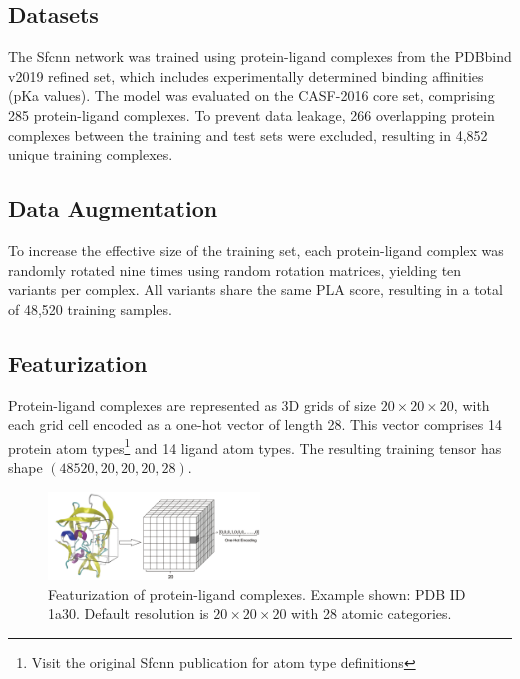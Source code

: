 \documentclass[unnumsec,webpdf,contemporary,large]{oup-authoring-template}
\theoremstyle{thmstyleone}%
\theoremstyle{thmstyletwo}%
\theoremstyle{thmstylethree}%
\begin{document}
\subsection{Datasets}
\vspace{0.5em}
The Sfcnn network was trained using protein-ligand complexes from the PDBbind v2019 refined set, which includes experimentally determined binding affinities (pKa values). The model was evaluated on the CASF-2016 core set, comprising 285 protein-ligand complexes. To prevent data leakage, 266 overlapping protein complexes between the training and test sets were excluded, resulting in 4,852 unique training complexes.

\subsection{Data Augmentation}
\vspace{0.5em}
To increase the effective size of the training set, each protein-ligand complex was randomly rotated nine times using random rotation matrices, yielding ten variants per complex. All variants share the same PLA score, resulting in a total of 48,520 training samples.

\subsection{Featurization}
\vspace{0.5em}
Protein-ligand complexes are represented as 3D grids of size $20 \times 20 \times 20$, with each grid cell encoded as a one-hot vector of length 28. This vector comprises 14 protein atom types\footnote{Visit the original Sfcnn publication for atom type definitions} and 14 ligand atom types. The resulting training tensor has shape $(48520, 20, 20, 20, 28)$.

\begin{figure}[H]
    \centering
    \includegraphics[width=0.5\textwidth]{images/one_hot.png}
    \caption{Featurization of protein-ligand complexes. Example shown: PDB ID 1a30. Default resolution is $20\times20\times20$ with 28 atomic categories.}
    \label{fig:onehot}
\end{figure}
\end{document}
